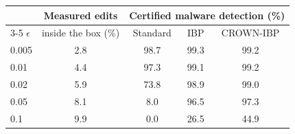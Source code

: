 \begin{tabular}{lcccc}
\toprule
 & Measured edits & \multicolumn{3}{c}{Certified malware detection (\%)} \\
\cmidrule(lr){3-5}
$\epsilon$ & inside the box (\%) & Standard & IBP & CROWN-IBP \\
\midrule
0.005 & 2.8 & 98.7 & 99.3 & 99.2 \\
0.01 & 4.4 & 97.3 & 99.1 & 99.2 \\
0.02 & 5.9 & 73.8 & 98.9 & 99.0 \\
0.05 & 8.1 & 8.0 & 96.5 & 97.3 \\
0.1 & 9.9 & 0.0 & 26.5 & 44.9 \\
\bottomrule
\end{tabular}